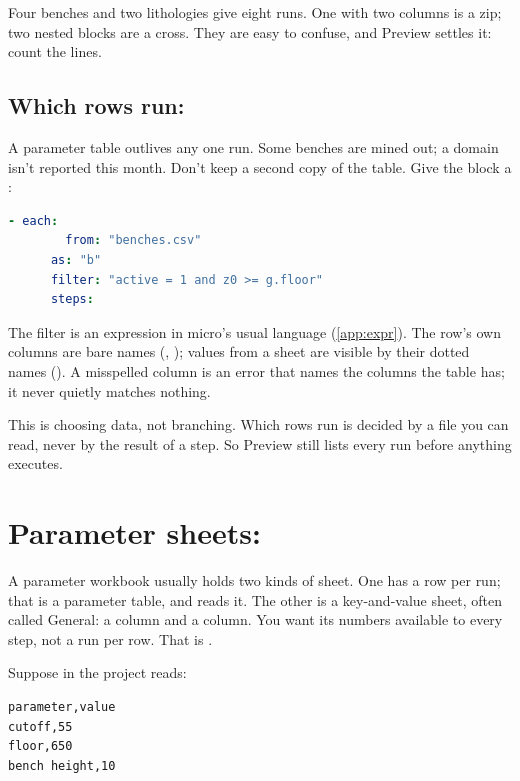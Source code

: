 Four benches and two lithologies give eight runs. One  with two columns is a zip; two nested  blocks are a cross. They are easy to confuse, and Preview settles it: count the lines.

\subsection{Which rows run: \texorpdfstring{}{filter:}}\label{sec:routines-filter}
A parameter table outlives any one run. Some benches are mined out; a domain isn't reported this month. Don't keep a second copy of the table. Give the block a :

\begin{lstlisting}[language=yaml]
    - each:
        from: "benches.csv"
      as: "b"
      filter: "active = 1 and z0 >= g.floor"
      steps:
\end{lstlisting}

The filter is an expression in micro's usual language (\cref{app:expr}). The row's own columns are bare names (, ); values from a  sheet are visible by their dotted names (). A misspelled column is an error that names the columns the table has; it never quietly matches nothing.

\begin{why}
This is choosing data, not branching. Which rows run is decided by a file you can read, never by the result of a step. So Preview still lists every run before anything executes.
\end{why}

\section{Parameter sheets: \texorpdfstring{}{params:}}\label{sec:routines-params}
A parameter workbook usually holds two kinds of sheet. One has a row per run; that is a parameter table, and  reads it. The other is a key-and-value sheet, often called General: a  column and a  column. You want its numbers available to every step, not a run per row. That is .

Suppose  in the project reads:

\begin{lstlisting}
parameter,value
cutoff,55
floor,650
bench height,10
\end{lstlisting}

